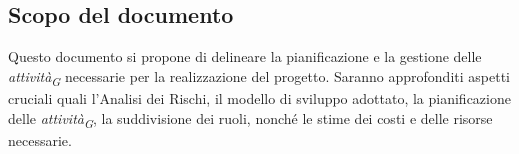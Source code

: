 \subsection{Scopo del documento}
Questo documento si propone di delineare la pianificazione e la gestione delle \textit{attività}\textsubscript{\textit{G}} necessarie per la realizzazione del progetto. Saranno approfonditi aspetti cruciali quali l'Analisi dei Rischi, il modello di sviluppo adottato, la pianificazione delle \textit{attività}\textsubscript{\textit{G}}, la suddivisione dei ruoli, nonché le stime dei costi e delle risorse necessarie.